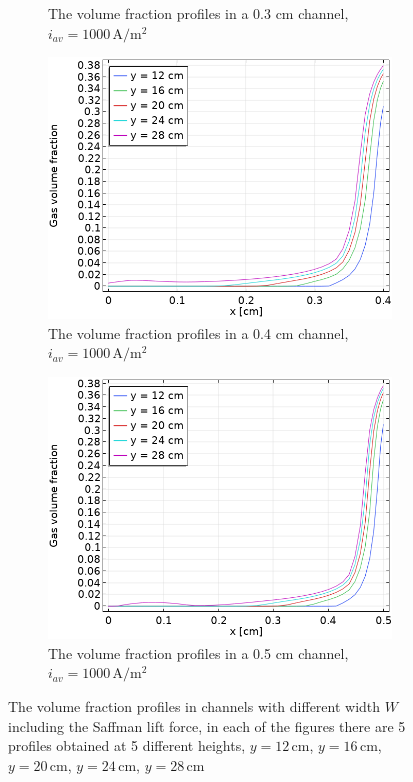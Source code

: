 \begin{figure}[H]
\begin{subfigure}{.5\textwidth}
  \caption{The volume fraction profiles in a 0.3 cm channel, $i_{av}=1000 \, \mathrm{A/m^2}$}
\end{subfigure}
\begin{subfigure}{.5\textwidth}
  \centering
  \includegraphics[width=1\linewidth]{volumefraction4mm1000A.png}
  \caption{The volume fraction profiles in a 0.4 cm channel, $i_{av}=1000 \, \mathrm{A/m^2}$}
\end{subfigure}%
\begin{subfigure}{.5\textwidth}
  \centering
  \includegraphics[width=1\linewidth]{volumefraction5mm1000A.png}
  \caption{The volume  fraction profiles in a 0.5 cm channel, $i_{av}=1000 \, \mathrm{A/m^2}$}
\end{subfigure}
\caption{The volume fraction profiles in channels with different width $W$ including the Saffman lift force, in each of the figures there are 5 profiles obtained at 5 different heights, $y = 12 \, \mathrm{cm}$, $y = 16 \, \mathrm{cm}$, $y = 20 \, \mathrm{cm}$, $y = 24 \, \mathrm{cm}$, $y = 28 \, \mathrm{cm}$}
\label{volumedifferentchannel}
\end{figure}

